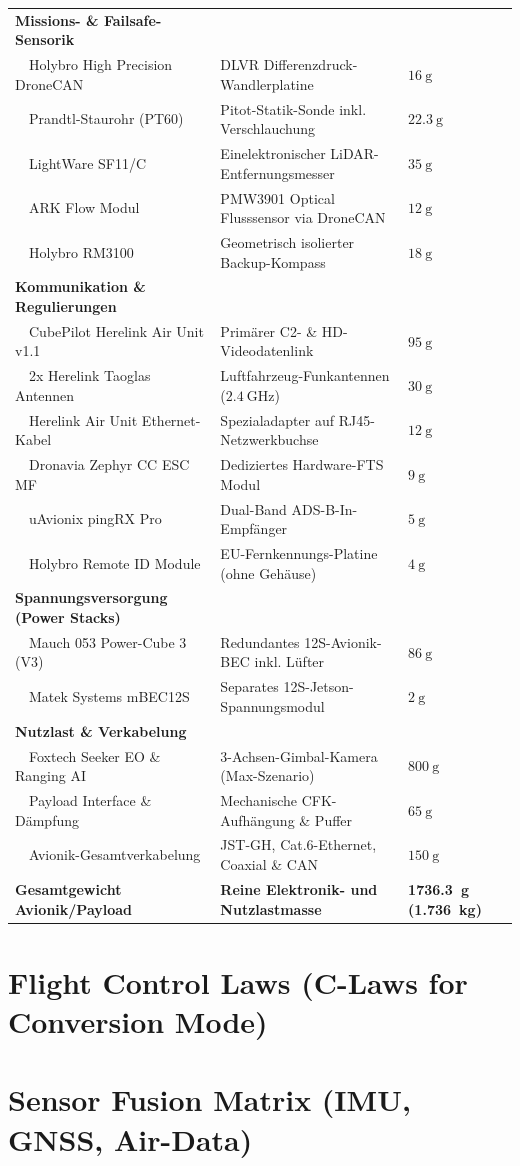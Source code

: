 \begin{longtable}{p{6.0cm} p{5.0cm} p{2.5cm}}
    \textbf{Missions- \& Failsafe-Sensorik} & & \\
    ~~Holybro High Precision DroneCAN & DLVR Differenzdruck-Wandlerplatine & $\SI{16}{\g}$ \\
    ~~Prandtl-Staurohr (PT60) & Pitot-Statik-Sonde inkl. Verschlauchung & $\SI{22.3}{\g}$ \\
    ~~LightWare SF11/C & Einelektronischer LiDAR-Entfernungsmesser & $\SI{35}{\g}$ \\
    ~~ARK Flow Modul & PMW3901 Optical Flusssensor via DroneCAN & $\SI{12}{\g}$ \\
    ~~Holybro RM3100 & Geometrisch isolierter Backup-Kompass & $\SI{18}{\g}$ \\
    \midrule
    
    \textbf{Kommunikation \& Regulierungen} & & \\
    ~~CubePilot Herelink Air Unit v1.1 & Primärer C2- \& HD-Videodatenlink & $\SI{95}{\g}$ \\
    ~~2x Herelink Taoglas Antennen & Luftfahrzeug-Funkantennen ($\SI{2.4}{\GHz}$) & $\SI{30}{\g}$ \\
    ~~Herelink Air Unit Ethernet-Kabel & Spezialadapter auf RJ45-Netzwerkbuchse & $\SI{12}{\g}$ \\
    ~~Dronavia Zephyr CC ESC MF & Dediziertes Hardware-FTS Modul & $\SI{9}{\g}$ \\
    ~~uAvionix pingRX Pro & Dual-Band ADS-B-In-Empfänger & $\SI{5}{\g}$ \\
    ~~Holybro Remote ID Module & EU-Fernkennungs-Platine (ohne Gehäuse) & $\SI{4}{\g}$ \\
    \midrule
    
    \textbf{Spannungsversorgung (Power Stacks)} & & \\
    ~~Mauch 053 Power-Cube 3 (V3) & Redundantes 12S-Avionik-BEC inkl. Lüfter & $\SI{86}{\g}$ \\
    ~~Matek Systems mBEC12S & Separates 12S-Jetson-Spannungsmodul & $\SI{2}{\g}$ \\
    \midrule
    
    \textbf{Nutzlast \& Verkabelung} & & \\
    ~~Foxtech Seeker EO \& Ranging AI & 3-Achsen-Gimbal-Kamera (Max-Szenario) & $\SI{800}{\g}$ \\
    ~~Payload Interface \& Dämpfung & Mechanische CFK-Aufhängung \& Puffer & $\SI{65}{\g}$ \\
    ~~Avionik-Gesamtverkabelung & JST-GH, Cat.6-Ethernet, Coaxial \& CAN & $\SI{150}{\g}$ \\
    \midrule
    
    \textbf{Gesamtgewicht Avionik/Payload} & \textbf{Reine Elektronik- und Nutzlastmasse} & \textbf{\SI{1736.3}{\g} (\SI{1.736}{\kg})} \\
\end{longtable}

\section{Flight Control Laws (C-Laws for Conversion Mode)}
\section{Sensor Fusion Matrix (IMU, GNSS, Air-Data)}
